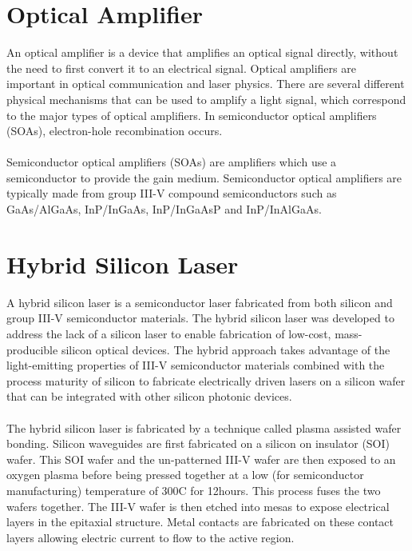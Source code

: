 \documentclass[12pt,a4paper]{report}
\begin{document}
\makeatletter
\patchcmd{\chapter}{\if@openright\cleardoublepage\else\clearpage\fi}{}{}{}
\makeatother

\chapter{Optical Amplifier}
 An optical amplifier is a device that amplifies an optical signal directly, without the need to first convert it to an electrical signal. Optical amplifiers are important in optical communication and laser physics. There are several different physical mechanisms that can be used to amplify a light signal, which correspond to the major types of optical amplifiers. In semiconductor optical amplifiers (SOAs), electron-hole recombination occurs. \\
 \\
 Semiconductor optical amplifiers (SOAs) are amplifiers which use a semiconductor to provide the gain medium. Semiconductor optical amplifiers are typically made from group III-V compound semiconductors such as GaAs/AlGaAs, InP/InGaAs, InP/InGaAsP and InP/InAlGaAs.

\makeatletter
\patchcmd{\chapter}{\if@openright\cleardoublepage\else\clearpage\fi}{}{}{}
\makeatother

\chapter{Hybrid Silicon Laser}
A hybrid silicon laser is a semiconductor laser fabricated from both silicon and group III-V semiconductor materials. The hybrid silicon laser was developed to address the lack of a silicon laser to enable fabrication of low-cost, mass-producible silicon optical devices. The hybrid approach takes advantage of the light-emitting properties of III-V semiconductor materials combined with the process maturity of silicon to fabricate electrically driven lasers on a silicon wafer that can be integrated with other silicon photonic devices. \\
\\
The hybrid silicon laser is fabricated by a technique called plasma assisted wafer bonding. Silicon waveguides are first fabricated on a silicon on insulator (SOI) wafer. This SOI wafer and the un-patterned III-V wafer are then exposed to an oxygen plasma before being pressed together at a low (for semiconductor manufacturing) temperature of 300C for 12hours. This process fuses the two wafers together. The III-V wafer is then etched into mesas to expose electrical layers in the epitaxial structure. Metal contacts are fabricated on these contact layers allowing electric current to flow to the active region. 
\end{document}
